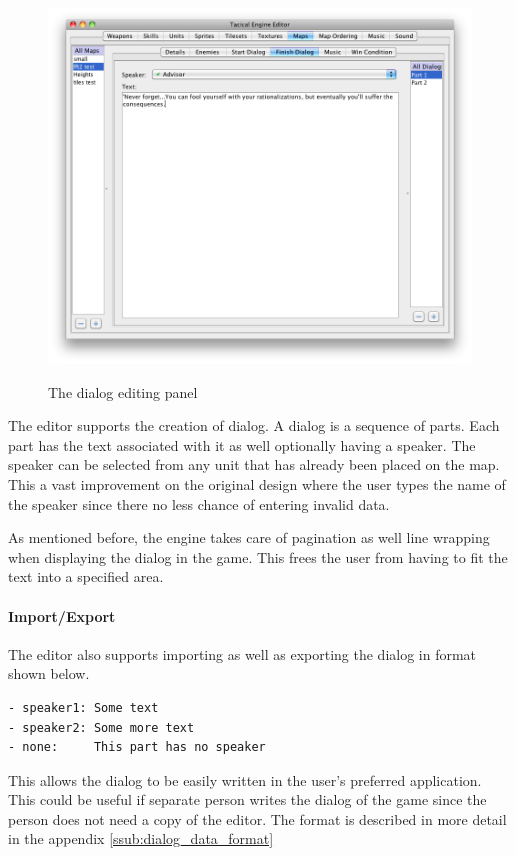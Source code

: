 \begin{figure}[htbp]
		\includegraphics[height=4in]{figures/editor/Maps-dialog.png}
	\caption{The dialog editing panel}
	\label{fig:figures_editor_Maps-dialog}
\end{figure}
The editor supports the creation of dialog.  A dialog is a sequence of parts. Each part has the text  associated with it as well optionally having a speaker.  The speaker can be selected from any unit that has already been placed on the map. This a vast improvement on the original design where the user types the name of the speaker since there no less chance of entering invalid data.

As mentioned before, the engine takes care of pagination as well line wrapping when displaying the dialog in the game. This frees the user from having to fit the text into a specified area. 

\paragraph{Import/Export\\}
The editor also supports importing as well as exporting the dialog in format shown below. 
\begin{lstlisting}[caption=Shows the format used  for the dialog]
- speaker1: Some text 
- speaker2: Some more text
- none:     This part has no speaker
\end{lstlisting}
This allows the dialog to be easily written in the user's preferred application.  This could be useful if separate person writes the dialog of the game since the person does not need a copy of the editor. The format is described in more detail in the appendix \ref{ssub:dialog_data_format}  

